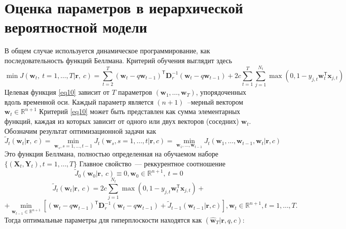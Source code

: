 \documentclass[12pt, twoside]{article}
\begin{document}
\section{Оценка параметров в иерархической вероятностной модели}
В общем случае используется динамическое программирование, как последовательность функций Беллмана. Критерий обучения выглядит здесь
\begin{equation}\label{eq10}
\min J(\textbf{w}_t,\ t=1,\ldots,T|\textbf{r},\ c) = \sum_{t=2}^T(\textbf{w}_t - q\textbf{w}_{t-1})^{\mathsf{T}}\textbf{D}^{-1}_r(\textbf{w}_t - q\textbf{w}_{t-1}) + 2c\sum_{t=1}^T\sum_{j=1}^{N_t}\max(0,1 - y_{j,t}\textbf{w}^{\mathsf{T}}_t\textbf{x}_{j,t})
\end{equation}
Целевая функция \eqref{eq10} зависит от $T$ параметров $(\textbf{w}_1, \ldots, \textbf{w}_T)$, упорядоченных вдоль временной оси. Каждый параметр является $(n+1)$~--мерный вектором $\textbf{w}_t \in \mathbb{R}^{n+1}$ Критерий \eqref{eq10} может быть представлен как сумма элементарных функций, каждая из которых зависит от одного или двух векторов (соседних) $\textbf{w}_t$. Обозначим результат оптимизационной задачи как \begin{equation}
\widetilde{J}_t(\textbf{w}_t|\textbf{r},\ c) = \underset{\textbf{w}_s, s= 1, \ldots, t - 1}\min J_t(\textbf{w}_s, s = 1, \ldots, t|\textbf{r},c) = \underset{\textbf{w}_1,\ldots, \textbf{w}_{t-1}}\min J_t(\textbf{w}_1,\ldots,\textbf{w}_{t-1}, \textbf{w}_t|\textbf{r},c)
\end{equation}
Это функция Беллмана, полностью определенная на обучаемом наборе $\{(\textbf{X}_t,\textbf{Y}_t), t = 1,\ldots,T\}$ Главное свойство~--- реккурентное соотношение
\begin{equation}
\widetilde{J}_0(\textbf{w}_0|\textbf{r},\ c) \equiv 0, \textbf{w}_0 \in \mathbb{R}^{n+1},\ t = 0
\end{equation}
\begin{equation}
\widetilde{J}_t(\textbf{w}_t|\textbf{r},\ c) = 2c\sum_{j = 1}^{N_t}\max(0,1 - y_{j,t}\textbf{w}^{\mathsf{T}}_t\textbf{x}_{j,t}) + 
\end{equation}
\begin{equation}
+ \underset{\textbf{w}_{t-1} \in \mathbb{R}^{n+1}}\min\left[(\textbf{w}_t - q\textbf{w}_{t-1})^{\mathsf{T}}\textbf{D}^{-1}_r(\textbf{w}_t - q\textbf{w}_{t-1}) + \widetilde{J}_{t-1}(\textbf{w}_{t-1}|\textbf{r},c)\right], \textbf{w}_t \in \mathbb{R}^{n+1}, t = 1,\ldots, T.
\end{equation}
Тогда оптимальные параметры для гиперплоскости находятся как $(\hat{\textbf{w}}_{T}|\textbf{r}, q, c)$:
\end{document}
